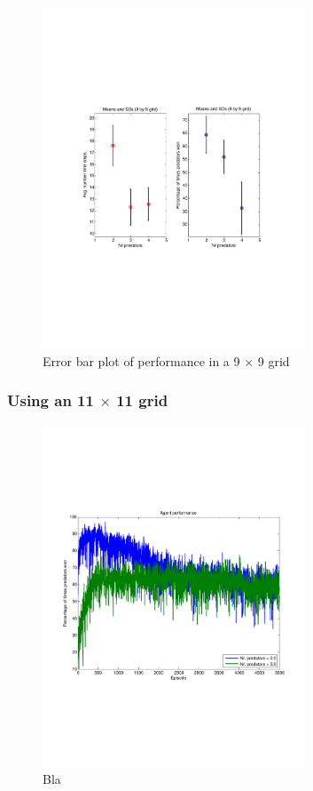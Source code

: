 \begin{figure}[hbt]
\centering
\includegraphics[bb = 0.6in 3in 7.9in 8.5in,clip,width=0.7\textwidth]{IQLgrid9by9ErrorBars.pdf} 
\caption{Error bar plot of performance in a 9 $\times$ 9 grid}
\label{fig:meansSds}
\end{figure}

\FloatBarrier


\subsubsection{Using an 11 $\times$ 11 grid}



\begin{figure}[hbt]
\centering
\includegraphics[bb = 0.6in 3in 7.9in 8.5in,clip,width=0.7\textwidth]{IQLpercentageWinning5000episodesavg200trials.pdf} 
\caption{Bla}
\label{}
\end{figure}

\FloatBarrier

